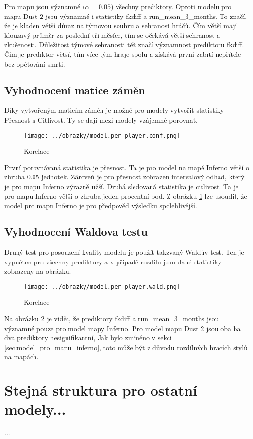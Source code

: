 Pro mapu jsou významné ($\alpha = 0.05$) všechny prediktory. Oproti modelu pro mapu Dust 2 jsou významné i statistiky fkdiff a run\_mean\_3\_months. To značí, že je 
kladen větší důraz na týmovou souhru a sehranost hráčů. Čím větší mají klouzavý průměr za poslední tři měsíce, tím se očekává větší sehranost a zkušenosti.
Důležitost týmové sehranosti též značí významnost prediktoru fkdiff. Čím je prediktor větší, tím více tým hraje spolu a získává první zabití nepřítele bez opětování smrti. 

\newpage
\subsection{Vyhodnocení matice záměn}
Díky vytvořeným maticím záměn je možné pro modely vytvořit statistiky Přesnost a Citlivost. Ty se dají mezi modely vzájemně porovnat.

\begin{figure}[H]
    \centering
    \texttt{[image: ../obrazky/model.per\_player.conf.png]}
    \caption{Korelace} 
    \label{fig:model.per_player.conf}
\end{figure}

První porovnávaná statistika je přesnost. Ta je pro model na mapě Inferno větší o zhruba 0.05 jednotek. Zároveň je pro přesnost zobrazen intervalový odhad, který je pro
mapu Inferno výrazně užší. Druhá sledovaná statistika je citlivost. Ta je pro mapu Inferno větší o zhruba jeden procentní bod. Z obrázku \ref{fig:model.per_player.conf}
lze usoudit, že model pro mapu Inferno je pro předpověď výsledku spolehlivější.

\newpage
\subsection{Vyhodnocení Waldova testu}
Druhý test pro posouzení kvality modelu je použít takzvaný Waldův test. Ten je vypočten pro všechny prediktory a v případě rozdílu jsou dané statistiky
zobrazeny na obrázku.

\begin{figure}[H]
    \centering
    \texttt{[image: ../obrazky/model.per\_player.wald.png]}
    \caption{Korelace} 
    \label{fig:model.per_player.wald}
\end{figure}

Na obrázku \ref{fig:model.per_player.wald} je vidět, že prediktory fkdiff a run\_mean\_3\_months jsou významné pouze pro model mapy Inferno. Pro model
mapu Dust 2 jsou oba ba dva prediktory nesignifikantní, Jak bylo zmíněno v sekci \ref{sec:model_pro_mapu_inferno}, toto může být z důvodu rozdílných
hracích stylů na mapách.

\section{Stejná struktura pro ostatní modely...}
...